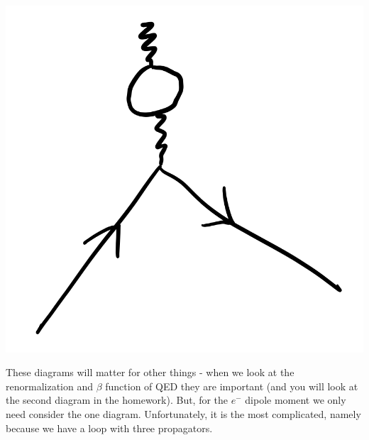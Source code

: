 \begin{center}
    \includegraphics[scale=0.35]{Lectures/Images/lec10-photonselfE.png}
\end{center}
These diagrams will matter for other things - when we look at the renormalization and $\beta$ function of QED they are important (and you will look at the second diagram in the homework). But, for the $e^{-}$ dipole moment we only need consider the one diagram. Unfortunately, it is the most complicated, namely because we have a loop with three propagators. 

